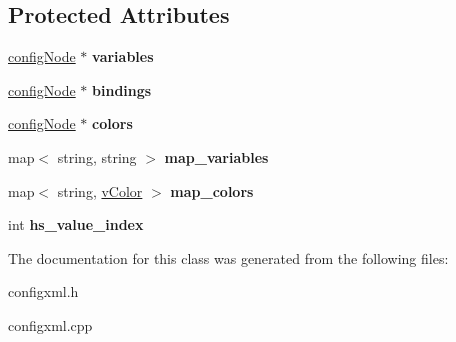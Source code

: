 \subsection*{Protected Attributes}
\begin{DoxyCompactItemize}
\item 
\hyperlink{classconfigNode}{config\+Node} $\ast$ {\bfseries variables}\hypertarget{classVegaConfig_a05db44e2db823172b35971142a6018f0}{}\label{classVegaConfig_a05db44e2db823172b35971142a6018f0}

\item 
\hyperlink{classconfigNode}{config\+Node} $\ast$ {\bfseries bindings}\hypertarget{classVegaConfig_a4b8650566ebb1b396ba9382993192a9e}{}\label{classVegaConfig_a4b8650566ebb1b396ba9382993192a9e}

\item 
\hyperlink{classconfigNode}{config\+Node} $\ast$ {\bfseries colors}\hypertarget{classVegaConfig_ab58dba1881aa22e850d34493d2bfa0d2}{}\label{classVegaConfig_ab58dba1881aa22e850d34493d2bfa0d2}

\item 
map$<$ string, string $>$ {\bfseries map\+\_\+variables}\hypertarget{classVegaConfig_ad6b391af6c230c6fcf0904db35225e00}{}\label{classVegaConfig_ad6b391af6c230c6fcf0904db35225e00}

\item 
map$<$ string, \hyperlink{classvColor}{v\+Color} $>$ {\bfseries map\+\_\+colors}\hypertarget{classVegaConfig_a56dc87359750169ff752e30c73debe37}{}\label{classVegaConfig_a56dc87359750169ff752e30c73debe37}

\item 
int {\bfseries hs\+\_\+value\+\_\+index}\hypertarget{classVegaConfig_a4f6c2accec317c79b9015760625e90f3}{}\label{classVegaConfig_a4f6c2accec317c79b9015760625e90f3}

\end{DoxyCompactItemize}


The documentation for this class was generated from the following files\+:\begin{DoxyCompactItemize}
\item 
configxml.\+h\item 
configxml.\+cpp\end{DoxyCompactItemize}
